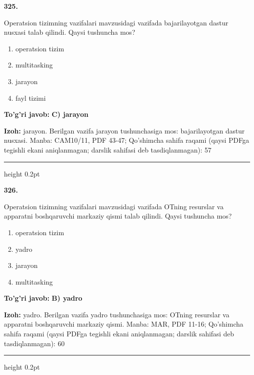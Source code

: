 \documentclass[10pt,a4paper]{article}
\begin{document}
{\bfseries\sffamily\color{ink} 325.}
\par
Operatsion tizimning vazifalari mavzusidagi vazifada bajarilayotgan dastur nusxasi talab qilindi. Qaysi tushuncha mos?
\begin{enumerate}[label=\Alph*),leftmargin=9mm]
\item operatsion tizim
\item multitasking
\item jarayon
\item fayl tizimi
\end{enumerate}
\begin{tcolorbox}[enhanced,breakable,colback=teal!4,colframe=teal!60!black,boxrule=0.45pt,arc=1.2mm,left=2.7mm,right=2.7mm,top=1.8mm,bottom=1.8mm,before skip=2mm,after skip=2mm]
{\bfseries\sffamily\color{teal}To'g'ri javob:} \textbf{C) jarayon}
\par\smallskip
{\bfseries Izoh:} jarayon. Berilgan vazifa jarayon tushunchasiga mos: bajarilayotgan dastur nusxasi. Manba: CAM10/11, PDF 43-47; Qo'shimcha sahifa raqami (qaysi PDFga tegishli ekani aniqlanmagan; darslik sahifasi deb tasdiqlanmagan): 57
\end{tcolorbox}
\vspace{2mm}\hrule height 0.2pt\vspace{3mm}

{\bfseries\sffamily\color{ink} 326.}
\par
Operatsion tizimning vazifalari mavzusidagi vazifada OTning resurslar va apparatni boshqaruvchi markaziy qismi talab qilindi. Qaysi tushuncha mos?
\begin{enumerate}[label=\Alph*),leftmargin=9mm]
\item operatsion tizim
\item yadro
\item jarayon
\item multitasking
\end{enumerate}
\begin{tcolorbox}[enhanced,breakable,colback=teal!4,colframe=teal!60!black,boxrule=0.45pt,arc=1.2mm,left=2.7mm,right=2.7mm,top=1.8mm,bottom=1.8mm,before skip=2mm,after skip=2mm]
{\bfseries\sffamily\color{teal}To'g'ri javob:} \textbf{B) yadro}
\par\smallskip
{\bfseries Izoh:} yadro. Berilgan vazifa yadro tushunchasiga mos: OTning resurslar va apparatni boshqaruvchi markaziy qismi. Manba: MAR, PDF 11-16; Qo'shimcha sahifa raqami (qaysi PDFga tegishli ekani aniqlanmagan; darslik sahifasi deb tasdiqlanmagan): 60
\end{tcolorbox}
\vspace{2mm}\hrule height 0.2pt\vspace{3mm}
\end{document}
